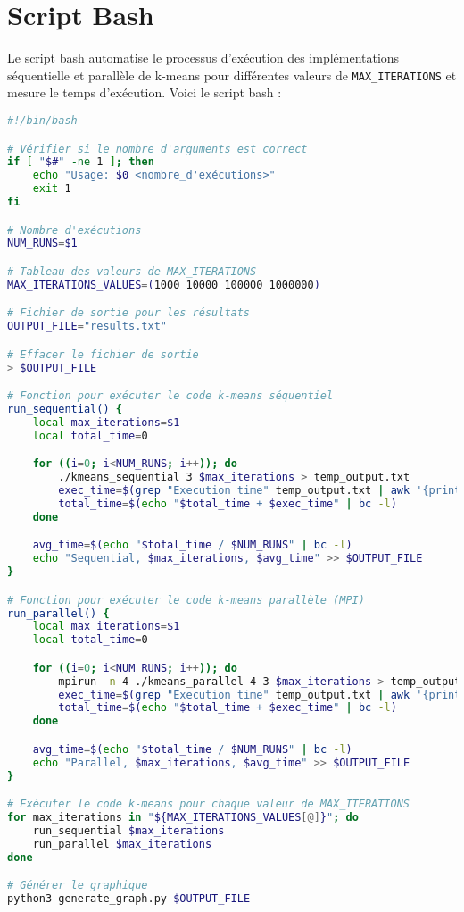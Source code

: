 \documentclass{article}
\begin{document}
\section{Script Bash}
Le script bash automatise le processus d'exécution des implémentations séquentielle et parallèle de k-means pour différentes valeurs de \texttt{MAX\_ITERATIONS} et mesure le temps d'exécution. Voici le script bash :

\begin{lstlisting}[language=bash, caption=Script bash pour automatiser l'exécution des implémentations de k-means]
#!/bin/bash

# Vérifier si le nombre d'arguments est correct
if [ "$#" -ne 1 ]; then
    echo "Usage: $0 <nombre_d'exécutions>"
    exit 1
fi

# Nombre d'exécutions
NUM_RUNS=$1

# Tableau des valeurs de MAX_ITERATIONS
MAX_ITERATIONS_VALUES=(1000 10000 100000 1000000)

# Fichier de sortie pour les résultats
OUTPUT_FILE="results.txt"

# Effacer le fichier de sortie
> $OUTPUT_FILE

# Fonction pour exécuter le code k-means séquentiel
run_sequential() {
    local max_iterations=$1
    local total_time=0

    for ((i=0; i<NUM_RUNS; i++)); do
        ./kmeans_sequential 3 $max_iterations > temp_output.txt
        exec_time=$(grep "Execution time" temp_output.txt | awk '{print $3}')
        total_time=$(echo "$total_time + $exec_time" | bc -l)
    done

    avg_time=$(echo "$total_time / $NUM_RUNS" | bc -l)
    echo "Sequential, $max_iterations, $avg_time" >> $OUTPUT_FILE
}

# Fonction pour exécuter le code k-means parallèle (MPI)
run_parallel() {
    local max_iterations=$1
    local total_time=0

    for ((i=0; i<NUM_RUNS; i++)); do
        mpirun -n 4 ./kmeans_parallel 4 3 $max_iterations > temp_output.txt
        exec_time=$(grep "Execution time" temp_output.txt | awk '{print $3}')
        total_time=$(echo "$total_time + $exec_time" | bc -l)
    done

    avg_time=$(echo "$total_time / $NUM_RUNS" | bc -l)
    echo "Parallel, $max_iterations, $avg_time" >> $OUTPUT_FILE
}

# Exécuter le code k-means pour chaque valeur de MAX_ITERATIONS
for max_iterations in "${MAX_ITERATIONS_VALUES[@]}"; do
    run_sequential $max_iterations
    run_parallel $max_iterations
done

# Générer le graphique
python3 generate_graph.py $OUTPUT_FILE
\end{lstlisting}
\end{document}

